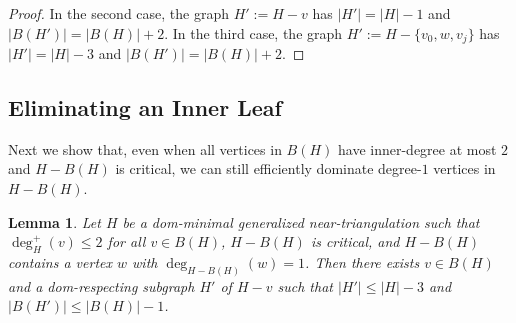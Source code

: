 \documentclass[12pt]{article}
\newtheorem{lem}{Lemma}
\theoremstyle{definition}
\begin{document}
\begin{proof}
  In the second case, the graph $H':=H-v$ has $|H'|=|H|-1$ and $|B(H')|=|B(H)|+2$. In the third case, the graph $H':=H-\{v_0,w,v_j\}$ has $|H'|=|H|-3$ and $|B(H')|=|B(H)|+2$.
\end{proof}


\subsection{Eliminating an Inner Leaf}

Next we show that, even when all vertices in $B(H)$ have inner-degree at most $2$ and $H-B(H)$ is critical, we can still efficiently dominate degree-$1$ vertices in $H-B(H)$.


\begin{lem}\label{leaf_killer}
  Let $H$ be a dom-minimal generalized near-triangulation such that $\deg^+_H(v)\le 2$ for all $v\in B(H)$, $H-B(H)$ is critical, and $H-B(H)$ contains a vertex $w$ with $\deg_{H-B(H)}(w)=1$.  Then there exists $v\in B(H)$ and a dom-respecting subgraph $H'$ of $H-v$ such that $|H'|\le |H|-3$ and $|B(H')|\le |B(H)|-1$.
\end{lem}
\end{document}
